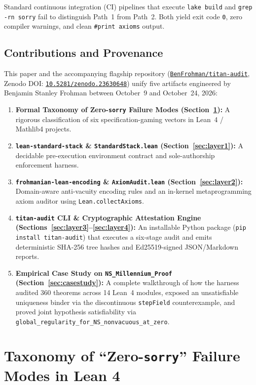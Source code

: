 \documentclass[11pt,a4paper]{article}
\theoremstyle{plain}
\theoremstyle{definition}
\begin{document}
Standard continuous integration (CI) pipelines that execute \texttt{lake build} and \texttt{grep -rn sorry} fail to distinguish Path~1 from Path~2. Both yield exit code \texttt{0}, zero compiler warnings, and clean \texttt{\#print axioms} output.

\subsection{Contributions and Provenance}

This paper and the accompanying flagship repository (\href{https://github.com/BenFrohman/titan-audit}{\texttt{BenFrohman/titan-audit}}, Zenodo DOI: \href{https://doi.org/10.5281/zenodo.23630648}{\texttt{10.5281/zenodo.23630648}}) unify five artifacts engineered by Benjamin Stanley Frohman between October~9 and October~24, 2026:
\begin{enumerate}[nosep]
  \item \textbf{Formal Taxonomy of Zero-\texttt{sorry} Failure Modes (Section~\ref{sec:taxonomy}):} A rigorous classification of six specification-gaming vectors in Lean~4 / Mathlib4 projects.
  \item \textbf{\texttt{lean-standard-stack} \& \texttt{StandardStack.lean} (Section~\ref{sec:layer1}):} A decidable pre-execution environment contract and sole-authorship enforcement harness.
  \item \textbf{\texttt{frohmanian-lean-encoding} \& \texttt{AxiomAudit.lean} (Section~\ref{sec:layer2}):} Domain-aware anti-vacuity encoding rules and an in-kernel metaprogramming axiom auditor using \texttt{Lean.collectAxioms}.
  \item \textbf{\texttt{titan-audit} CLI \& Cryptographic Attestation Engine (Sections~\ref{sec:layer3}--\ref{sec:layer4}):} An installable Python package (\texttt{pip install titan-audit}) that executes a six-stage audit and emits deterministic SHA-256 tree hashes and Ed25519-signed JSON/Markdown reports.
  \item \textbf{Empirical Case Study on \texttt{NS\_Millennium\_Proof} (Section~\ref{sec:casestudy}):} A complete walkthrough of how the harness audited 360 theorems across 14 Lean~4 modules, exposed an unsatisfiable uniqueness binder via the discontinuous \texttt{stepField} counterexample, and proved joint hypothesis satisfiability via \texttt{global\_regularity\_for\_NS\_nonvacuous\_at\_zero}.
\end{enumerate}

\section{Taxonomy of ``Zero-\texttt{sorry}'' Failure Modes in Lean 4}\label{sec:taxonomy}
\end{document}
